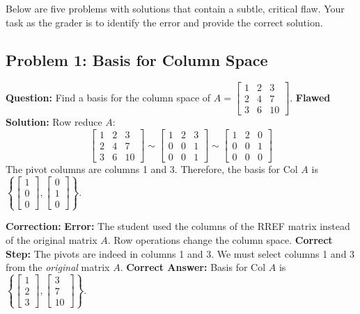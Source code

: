 \documentclass[12pt]{article}
\begin{document}
Below are five problems with solutions that contain a subtle, critical flaw. Your task as the grader is to identify the error and provide the correct solution.

\subsection{Problem 1: Basis for Column Space}
\textbf{Question:} Find a basis for the column space of $A = \begin{bmatrix} 1 & 2 & 3 \\ 2 & 4 & 7 \\ 3 & 6 & 10 \end{bmatrix}$.
\textbf{Flawed Solution:}
Row reduce $A$:
\[ \begin{bmatrix} 1 & 2 & 3 \\ 2 & 4 & 7 \\ 3 & 6 & 10 \end{bmatrix} \sim \begin{bmatrix} 1 & 2 & 3 \\ 0 & 0 & 1 \\ 0 & 0 & 1 \end{bmatrix} \sim \begin{bmatrix} 1 & 2 & 0 \\ 0 & 0 & 1 \\ 0 & 0 & 0 \end{bmatrix} \]
The pivot columns are columns 1 and 3. Therefore, the basis for Col $A$ is $\left\{ \begin{bmatrix} 1 \\ 0 \\ 0 \end{bmatrix}, \begin{bmatrix} 0 \\ 1 \\ 0 \end{bmatrix} \right\}$.

\textbf{Correction:}
\textbf{Error:} The student used the columns of the RREF matrix instead of the original matrix $A$. Row operations change the column space.
\textbf{Correct Step:} The pivots are indeed in columns 1 and 3. We must select columns 1 and 3 from the \textit{original} matrix $A$.
\textbf{Correct Answer:} Basis for Col $A$ is $\left\{ \begin{bmatrix} 1 \\ 2 \\ 3 \end{bmatrix}, \begin{bmatrix} 3 \\ 7 \\ 10 \end{bmatrix} \right\}$.
\end{document}
